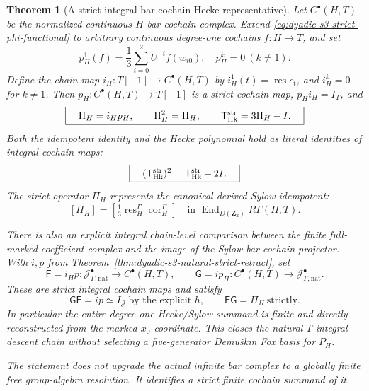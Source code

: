 \documentclass[11pt]{article}
\newtheorem{theorem}{Theorem}[section]
\theoremstyle{definition}
\begin{document}
\begin{theorem}[A strict integral bar-cochain Hecke representative]
\label{thm:dyadic-s3-strict-bar-hecke-projector}
Let $C^\bullet(H,T)$ be the
normalized continuous $H$-bar
cochain complex.  Extend
\eqref{eq:dyadic-s3-strict-phi-functional}
to \emph{arbitrary} continuous
degree-one cochains
$f:H\to T$, and set
\[
p_H^1(f)=\frac13\sum_{i=0}^{2}
U^{-i}f(w_{i0}),\quad
p_H^k=0\ (k\ne1).
\]
Define the chain map
$i_H:T[-1]\to C^\bullet(H,T)$
by $i_H^1(t)=\operatorname{res}c_t$,
and $i_H^k=0$ for $k\ne1$.
Then $p_H:C^\bullet(H,T)\to T[-1]$
is a \emph{strict cochain map},
$p_Hi_H=I_T$, and
\begin{equation}\label{eq:dyadic-s3-strict-bar-projector}
\boxed{\quad
\Pi_H=i_Hp_H,\qquad
\Pi_H^2=\Pi_H,\qquad
\mathsf T_{\rm Hk}^{\rm str}=3\Pi_H-I.
\quad}
\end{equation}
Both the idempotent identity
and the Hecke polynomial hold
as \emph{literal identities of
integral cochain maps}:
\begin{equation}\label{eq:dyadic-s3-strict-bar-hecke-polynomial}
\boxed{\quad
(\mathsf T_{\rm Hk}^{\rm str})^2
=\mathsf T_{\rm Hk}^{\rm str}+2I.
\quad}
\end{equation}
The strict operator
$\Pi_H$ represents the
\emph{canonical derived}
Sylow idempotent:
\begin{equation}\label{eq:dyadic-s3-bar-derived-equality}
[\Pi_H]=
\left[
\tfrac13\operatorname{res}_H^\Gamma
\operatorname{cor}_H^\Gamma
\right]
\quad
\text{in }
\operatorname{End}_{D(\mathbf Z_2)}
R\Gamma(H,T).
\end{equation}

There is also an explicit
integral chain-level comparison
between the \emph{finite}
full-marked coefficient
complex and the \emph{image}
of the Sylow bar-cochain
projector.  With $i,p$ from
Theorem~\ref{thm:dyadic-s3-natural-strict-retract},
set
\begin{equation}\label{eq:dyadic-s3-marked-to-sylow-chain-maps}
\mathsf F=i_Hp:
\mathcal J^\bullet_{\Gamma,\mathrm{nat}}
\longrightarrow C^\bullet(H,T),
\qquad
\mathsf G=i p_H:
C^\bullet(H,T)
\longrightarrow\mathcal J^\bullet_{\Gamma,\mathrm{nat}}.
\end{equation}
These are \emph{strict integral}
cochain maps and satisfy
\begin{equation}\label{eq:dyadic-s3-marked-to-sylow-composites}
\boxed{\quad
\mathsf G\mathsf F=i p
\simeq I_{\mathcal J}
\ \text{by the explicit }h,
\qquad
\mathsf F\mathsf G=\Pi_H
\ \text{strictly}.
\quad}
\end{equation}
In particular the entire
degree-one Hecke/Sylow
summand is finite and
directly reconstructed from
the marked $x_0$-coordinate.
This closes the natural-$T$
\emph{integral descent chain}
without selecting a
five-generator Demu\v{s}kin
Fox basis for $P_H$.

The statement does \emph{not}
upgrade the actual infinite
bar complex to a globally
finite free group-algebra
resolution.  It identifies
a \emph{strict finite
cochain summand} of it.
\end{theorem}
\end{document}
